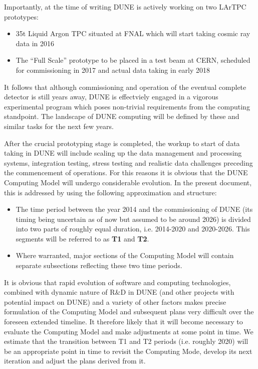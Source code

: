 Importantly, at the time of writing DUNE is actively working on two LArTPC prototypes:
\begin{itemize}
\item 35t Liquid Argon TPC situated at FNAL which will start taking cosmic ray data in 2016
\item The ``Full Scale'' prototype to be placed in a test beam at CERN, scheduled for commissioning in 2017 and actual data taking in early 2018
\end{itemize}

It follows that although commissioning and operation of the eventual complete detector is still years away, DUNE is effectviely engaged
in a vigorous experimental program which poses non-trivial requirements from the computing standpoint. The landscape of DUNE
computing will be defined by these and similar tasks for the next few years.

After the crucial prototyping stage is completed, the workup to start of data taking in DUNE will include scaling up the data management and processing systems,
integration testing,  stress testing and  realistic data challenges preceding the commencement of operations. For this reasons it is obvious that the DUNE
Computing Model will undergo considerable evolution. In the present document, this is addressed  by using the following approximation and structure:

\begin{itemize}

\item The time period between the year 2014 and the commissioning of DUNE (its timing being uncertain as of now but assumed to be around 2026) is divided into two parts of roughly equal duration, i.e. 2014-2020 and 2020-2026. This segments will be referred to as \textbf{T1} and \textbf{T2}.


\item Where warranted, major sections of the Computing Model will contain separate subsections reflecting these two time periods.

\end{itemize}
 
It is obvious that rapid evolution of software and computing technologies, combined with dynamic nature of R\&D in DUNE (and other  projects with potential impact on DUNE) and a variety of other factors makes precise formulation of the Computing Model and subsequent plans very difficult over the foreseen extended timeline. It  therefore likely that it will become necessary to evaluate the Computing Model and make adjustments at some point in time. We estimate that the transition between T1 and T2 periods (i.e. roughly 2020) will be an appropriate point in time to revisit the Computing Mode, develop its next
iteration and adjust the plans derived from it.

